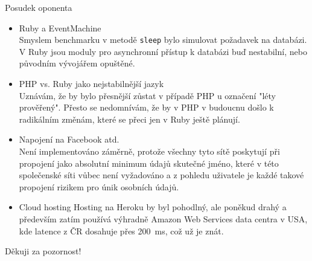 \documentclass[xcolor=dvipsnames]{beamer}
\begin{document}
	\begin{frame}{Posudek oponenta}
  	\begin{itemize}
			\item Ruby a EventMachine\\
			  Smyslem benchmarku v metodě \texttt{sleep} bylo simulovat požadavek na databázi. V Ruby jsou moduly pro asynchronní přístup k databázi buď nestabilní, nebo původním vývojářem opuštěné.
			\item PHP vs. Ruby jako nejstabilnější jazyk\\
				Uznávám, že by bylo přesnější zůstat v případě PHP u označení "léty prověřený". Přesto se nedomnívám, že by v PHP v budoucnu došlo k radikálním změnám, které se přeci jen v Ruby ještě plánují.
			\item Napojení na Facebook atd.\\
				Není implementováno záměrně, protože všechny tyto sítě poskytují při propojení jako absolutní minimum údajů skutečné jméno, které v této společenské síti vůbec není vyžadováno a z pohledu uživatele je každé takové propojení rizikem pro únik osobních údajů.
			\item Cloud hosting
				Hosting na Heroku by byl pohodlný, ale poněkud drahý a především zatím používá výhradně Amazon Web Services data centra v USA, kde latence z ČR dosahuje přes 200~ms, což už je znát.
				
		\end{itemize}
	\end{frame}
	
	\begin{frame}
		\begin{center}
			Děkuji za pozornost!
		\end{center}
	\end{frame}
\end{document}
